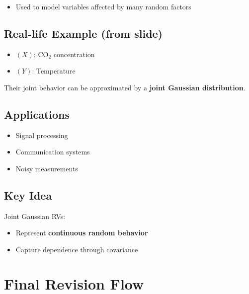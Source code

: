 \documentclass[12pt]{article}
\begin{document}
\begin{itemize}
    \item Used to model variables affected by many random factors
\end{itemize}

\subsection*{Real-life Example (from slide)}

\begin{itemize}
    \item $(X)$: CO$_2$ concentration
    \item $(Y)$: Temperature
\end{itemize}

Their joint behavior can be approximated by a \textbf{joint Gaussian distribution}.

\subsection*{Applications}

\begin{itemize}
    \item Signal processing
    \item Communication systems
    \item Noisy measurements
\end{itemize}

\subsection*{Key Idea}

Joint Gaussian RVs:
\begin{itemize}
    \item Represent \textbf{continuous random behavior}
    \item Capture dependence through covariance
\end{itemize}

\section*{Final Revision Flow}
\end{document}
